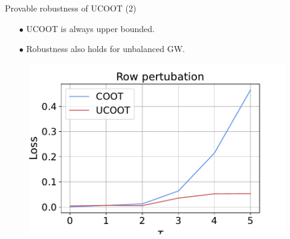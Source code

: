 \documentclass{beamer}
\begin{document}
\begin{frame}{Provable robustness of UCOOT (2)}
\begin{minipage}[t]{0.6\linewidth}
  \begin{itemize}
    \item[$\bullet$] UCOOT is always upper bounded.
    \item[$\bullet$] Robustness also holds for unbalanced GW.
  \end{itemize}
\end{minipage}%
\hfill%
\hspace{-6cm}
\begin{minipage}[t]{0.47\linewidth}
  \vspace{-0.3cm}
  \begin{figure}
    \centering
    \includegraphics[width=1.05\linewidth, keepaspectratio=true]{SIMPAS/robustness_2.pdf}
  \end{figure}
\end{minipage}


\end{frame}
\end{document}
